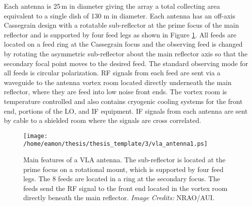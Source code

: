 Each antenna is 25\,m in diameter giving the array a total collecting area equivalent to a single dish of 130 m in diameter. Each antenna has an off-axis Cassegrain design with a rotatable sub-reflector at the prime focus of the main reflector and is supported by four feed legs as shown in Figure \ref{fig:3.5}. All feeds are located on a feed ring at the Cassegrain focus and the observing feed is changed by rotating the asymmetric sub-reflector about the main reflector axis so that the secondary focal point moves to the desired feed. The standard observing mode for all feeds is circular polarization. RF signals from each feed  are sent via a waveguide to the antenna vortex room located directly underneath the main reflector, where they are feed into low noise front ends. The vortex room is temperature controlled and also contains cryogenic cooling systems for the front end, portions of the LO, and IF equipment. IF signals from each antenna are sent by cable to a shielded room where the signals are cross correlated.

\begin{figure}[t!]
\centering 
          \texttt{[image: /home/eamon/thesis/thesis\_template/3/vla\_antenna1.ps]}
\caption[Main features of a VLA antenna]{Main features of a VLA antenna. The sub-reflector is located at the prime focus on a rotational mount, which is supported by four feed legs. The 8 feeds are located in a ring at the secondary focus. The feeds send the RF signal to the front end located in the vortex room directly beneath the main reflector. \textit{Image Credits:} NRAO/AUI.}
\label{fig:3.5}
\end{figure}

